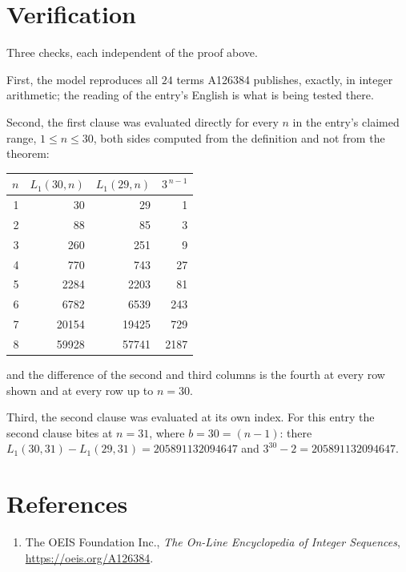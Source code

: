 \documentclass[11pt,a4paper]{article}
\theoremstyle{plain}
\theoremstyle{definition}
\begin{document}
\section{Verification}

Three checks, each independent of the proof above.

First, the model reproduces all $24$ terms A126384 publishes, exactly, in integer
arithmetic; the reading of the entry's English is what is being tested there.

Second, the first clause was evaluated directly for every $n$ in the entry's claimed range,
$1\le n\le30$, both sides computed from the definition and not from the theorem:

\begin{center}
\begin{tabular}{rrrr}
$n$ & $L_{1}(30,n)$ & $L_{1}(29,n)$ & $3^{\,n-1}$ \\ \hline
1 & 30 & 29 & 1 \\
2 & 88 & 85 & 3 \\
3 & 260 & 251 & 9 \\
4 & 770 & 743 & 27 \\
5 & 2284 & 2203 & 81 \\
6 & 6782 & 6539 & 243 \\
7 & 20154 & 19425 & 729 \\
8 & 59928 & 57741 & 2187 \\
\end{tabular}
\end{center}

\noindent and the difference of the second and third columns is the fourth at every row shown
and at every row up to $n=30$.

Third, the second clause was evaluated at its own index. For this entry the second clause bites at $n=31$, where $b=30=(n-1)$: there $L_{1}(30,31)-L_{1}(29,31)=205891132094647$ and $3^{30}-2=205891132094647$.

\section*{References}
\begin{enumerate}
\item The OEIS Foundation Inc., \emph{The On-Line Encyclopedia of Integer Sequences},
\url{https://oeis.org/A126384}.
\end{enumerate}
\end{document}
